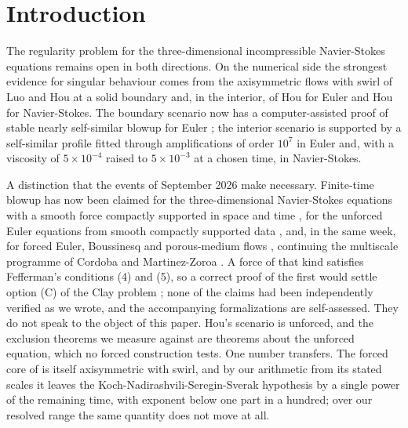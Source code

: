 \documentclass[11pt]{article}
\newcommand{\sn}[2]{#1\times 10^{#2}}
\begin{document}
\begin{abstract}
collapse by a factor of 2.0 to 2.6 over the threshold, the margin being smallest at Hou's second-stage viscosity, where the claim is correspondingly weakest (the enclosures are statements about the eigenvalue in inverse seconds and do not involve the singular time; only the conversion to collapse units does); the Leibovich-Stewartson sufficient condition is certified on the same kind of field by Sturm root counting in exact arithmetic. The local front structure is an exact infinite-energy Navier-Stokes solution, which explains why a core-resolving computation cannot observe the departure that finite energy forces at a few collapse lengths.
\end{abstract}

\section{Introduction}

The regularity problem for the three-dimensional incompressible Navier-Stokes equations remains open in both directions. On the numerical side the strongest evidence for singular behaviour comes from the axisymmetric flows with swirl of Luo and Hou \cite{LH14a,LH14b} at a solid boundary and, in the interior, of Hou \cite{H23a} for Euler and Hou \cite{H23b} for Navier-Stokes. The boundary scenario now has a computer-assisted proof of stable nearly self-similar blowup for Euler \cite{CH25}; the interior scenario is supported by a self-similar profile fitted through amplifications of order $10^{7}$ in Euler and, with a viscosity of $\sn{5}{-4}$ raised to $\sn{5}{-3}$ at a chosen time, in Navier-Stokes.

A distinction that the events of September 2026 make necessary. Finite-time blowup has now been claimed for the three-dimensional Navier-Stokes equations with a smooth force compactly supported in space and time \cite{OAI26a}, for the unforced Euler equations from smooth compactly supported data \cite{OAI26b}, and, in the same week, for forced Euler, Boussinesq and porous-medium flows \cite{AB26}, continuing the multiscale programme of Cordoba and Martinez-Zoroa \cite{CMZ24}. A force of that kind satisfies Fefferman's conditions (4) and (5), so a correct proof of the first would settle option (C) of the Clay problem \cite{F00}; none of the claims had been independently verified as we wrote, and the accompanying formalizations are self-assessed. They do not speak to the object of this paper. Hou's scenario is unforced, and the exclusion theorems we measure against \cite{CSTY08,KNSS09,SS09} are theorems about the unforced equation, which no forced construction tests. One number transfers. The forced core of \cite{OAI26a} is itself axisymmetric with swirl, and by our arithmetic from its stated scales it leaves the Koch-Nadirashvili-Seregin-Sverak hypothesis by a single power of the remaining time, with exponent below one part in a hundred; over our resolved range the same quantity does not move at all.
\end{document}
